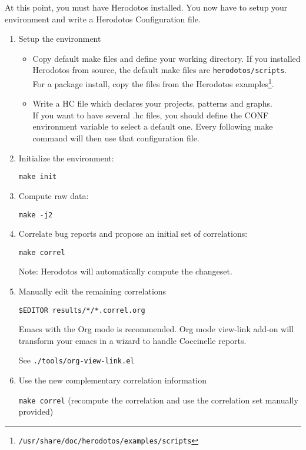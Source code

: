 
\label{chap:howto}

At this point, you must have Herodotos installed. You now have to
setup your environment and write a Herodotos Configuration file.

\begin{enumerate}
\item Setup the environment
  \begin{itemize}
  \item Copy default make files and define your working directory. If
    you installed Herodotos from source, the default make files are
    \texttt{herodotos/scripts}. For a package install, copy the files
    from the Herodotos
    examples\footnote{\texttt{/usr/share/doc/herodotos/examples/scripts}}.
  \item Write a HC file which declares your projects, patterns and graphs.\\
    If you want to have several .hc files, you should define the CONF
    environment variable to select a default one. Every following make
    command will then use that configuration file.
  \end{itemize}

\item Initialize the environment:

  \texttt{make init}

\item Compute raw data:

  \texttt{make -j2}

\item Correlate bug reports and propose an initial set of
  correlations:

  \texttt{make correl}

  Note: Herodotos will automatically compute the changeset.

\item Manually edit the remaining correlations

  \texttt{\$EDITOR results/*/*.correl.org}

  Emacs with the Org mode is recommended.
  Org mode view-link add-on will transform your
  emacs in a wizard to handle Coccinelle reports.

  See \texttt{./tools/org-view-link.el}

\item Use the new complementary correlation information

  \texttt{make correl} (recompute the correlation and use the
  correlation set manually provided)


\end{enumerate}
